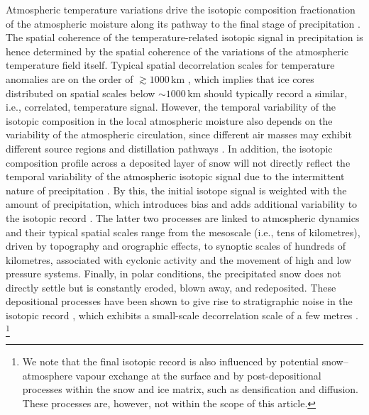 \documentclass[cp, manuscript]{copernicus}
\begin{document}
Atmospheric temperature variations drive the isotopic composition fractionation
of the atmospheric moisture along its pathway to the final stage of
precipitation \citep{Dansgaard1964,Jouzel1984}. The spatial coherence of the
temperature-related isotopic signal in precipitation is hence determined by the
spatial coherence of the variations of the atmospheric temperature field
itself. Typical spatial decorrelation scales for temperature anomalies are on
the order of $\gtrsim1000$\,km \citep{Jones1997}, which implies that ice cores
distributed on spatial scales below $\sim 1000$\,km should typically record a
similar, i.e., correlated, temperature signal. However, the temporal variability
of the isotopic composition in the local atmospheric moisture also depends on
the variability of the atmospheric circulation, since different air masses may
exhibit different source regions and distillation pathways \citep{Schlosser2004,
Sodemann2008a,Birks2009,Kuttel2012}. In addition, the isotopic composition
profile across a deposited layer of snow will not directly reflect the temporal
variability of the atmospheric isotopic signal due to the intermittent nature of
precipitation \citep{Schleiss2015}. By this, the initial isotope signal is
weighted with the amount of precipitation, which introduces bias
\citep{Steig1994,Laepple2011a} and adds additional variability to the isotopic
record \citep{Persson2011,Casado2020}. The latter two processes are linked to
atmospheric dynamics and their typical spatial scales range from the mesoscale
(i.e., tens of kilometres), driven by topography and orographic effects, to
synoptic scales of hundreds of kilometres, associated with cyclonic activity and
the movement of high and low pressure systems. Finally, in polar conditions, the
precipitated snow does not directly settle but is constantly eroded, blown away,
and redeposited. These depositional processes have been shown to give rise to
stratigraphic noise in the isotopic record \citep{Fisher1985,Munch2016}, which
exhibits a small-scale decorrelation scale of a few metres \citep{Munch2016}.%
\footnote{We note that the final isotopic record is also influenced by
  potential snow--atmosphere vapour exchange at the surface and by
  post-depositional processes within the snow and ice matrix, such as
  densification and diffusion. These processes are, however, not within the
  scope of this article.}
\end{document}
